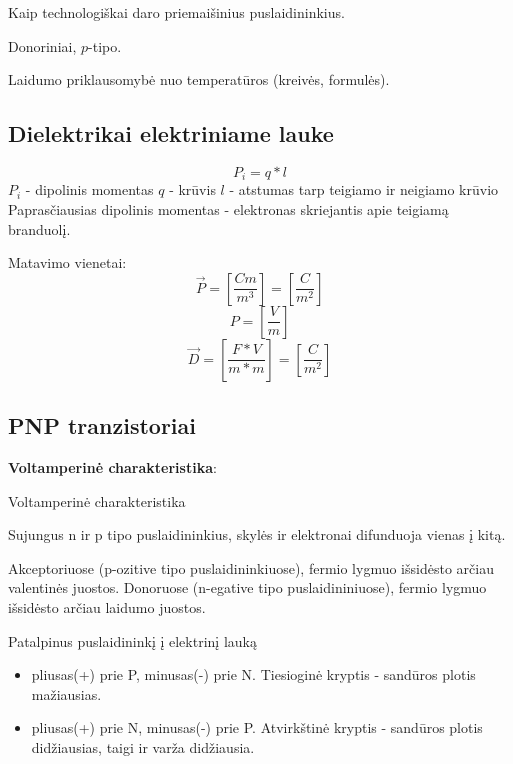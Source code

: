 \begin{remember}
  \item Kaip technologiškai daro priemaišinius puslaidininkius.
  \item Donoriniai, $p$-tipo.
  \item Laidumo priklausomybė nuo temperatūros (kreivės, formulės).
\end{remember}


\subsection{Dielektrikai elektriniame lauke}

\begin{equation*}
  P_i = q*l
\end{equation*}
$P_i$ - dipolinis momentas
$q$ - krūvis
$l$ - atstumas tarp teigiamo ir neigiamo krūvio
Paprasčiausias dipolinis momentas - elektronas skriejantis apie teigiamą branduolį.

Matavimo vienetai:
\begin{equation*}
  \overrightarrow{P} = [\frac{Cm}{m^3}]=[\frac{C}{m^2}]
\end{equation*}
\begin{equation*}
  P = [\frac{V}{m}]
\end{equation*}
\begin{equation*}
  \overrightarrow{D} = [\frac{F*V}{m*m}]=[\frac{C}{m^2}]
\end{equation*}


\subsection{PNP tranzistoriai}

\textbf{Voltamperinė charakteristika}:

{Voltamperinė charakteristika}

Sujungus n ir p tipo puslaidininkius, skylės ir elektronai difunduoja vienas į kitą.

Akceptoriuose (p-ozitive tipo puslaidininkiuose), fermio lygmuo išsidėsto arčiau valentinės juostos.
Donoruose (n-egative tipo puslaidininiuose), fermio lygmuo išsidėsto arčiau laidumo juostos.

Patalpinus puslaidininkį į elektrinį lauką
\begin{itemize}
  \item pliusas(+) prie P, minusas(-) prie N. Tiesioginė kryptis -
  sandūros plotis mažiausias.
  \item pliusas(+) prie N, minusas(-) prie P. Atvirkštinė kryptis -
  sandūros plotis didžiausias, taigi ir varža didžiausia.
\end{itemize}


